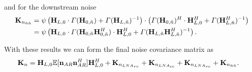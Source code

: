 and for the downstream noise
\begin{align}
\nonumber
\mathbf{K}_{n_{\tilde{n}\tilde{n}}}
&=\psi\left(\mathbf{H}_{L,0}\cdot\Gamma(\mathbf{H}_{0,\tilde{n}})+\Gamma(\mathbf{H}_{L,\tilde{n}})^{-1}\right)\cdot
\left(\Gamma(\mathbf{H}_{0,\tilde{n}})^H\cdot\mathbf{H}_{L,0}^H+\Gamma(\mathbf{H}_{L,\tilde{n}}^H)^{-1}\right)\\
&=\psi\left(\mathbf{H}_{L,0}\cdot\Gamma(\mathbf{H}_{0,\tilde{n}}\mathbf{H}_{0,\tilde{n}}^H)\cdot\mathbf{H}_{L,0}^H + \Gamma(\mathbf{H}_{L,\tilde{n}}\mathbf{H}_{L,\tilde{n}}^H)^{-1}\right).
\end{align}

With these results we can form the final noise covariance matrix as 
\begin{align}
\label{eq:noise_cov}
\mat{K}_n&= %
\mat{H}_{L,0}\mathbb{E}[\vec{n}_{AR}\vec{n}_{AR}^H]\mat{H}_{L,0}^H +
\mat{K}_{n_{LNA_{vv}}}+
\mat{K}_{n_{LNA_{cc}}}+
\mat{K}_{n_{LNA_{vc}}}+
\mat{K}_{n_{\tilde{n}\tilde{n}}}.
\end{align}









